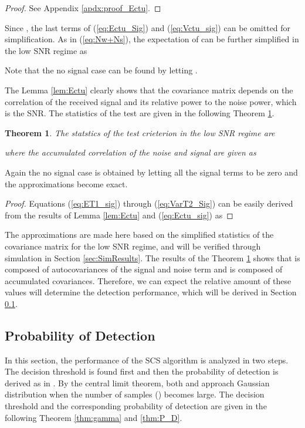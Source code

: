 \documentclass[draftclsnofoot,onecolumn,12pt]{IEEEtran}
\newtheorem{theorem}{Theorem}\newtheorem{lemma}{Lemma}
\begin{document}
\begin{proof}
  See Appendix \ref{apdx:proof_Ectu}.
\end{proof}

Since , the last terms of (\ref{eq:Ectu_Sig}) and (\ref{eq:Vctu_sig}) can be omitted for simplification. As in (\ref{eq:Nw+Ns}), the expectation of  can be further simplified in the low SNR regime as

Note that the no signal case  can be found by letting .

The Lemma \ref{lem:Ectu} clearly shows that the covariance matrix depends on the correlation of the received signal and its relative power to the noise power, which is the SNR.
The statistics of the test are given in the following Theorem \ref{thm:ET1T2}. 
\begin{theorem}\label{thm:ET1T2}
The statstics of the test crieterion in the low SNR regime are
  
  where the accumulated correlation of the noise and signal are given as
  
\end{theorem}
Again the no signal case is obtained by letting all the signal terms to be zero and the approximations become exact.

\begin{proof}
Equations (\ref{eq:ET1_sig}) through (\ref{eq:VarT2_Sig}) can be easily derived from the results of Lemma \ref{lem:Ectu} and (\ref{eq:Ectu_sig}) as
  
\end{proof}

The approximations are made here based on the simplified statistics of the covariance matrix for the low SNR regime, and will be verified through simulation in Section \ref{sec:SimResults}.
The results of the Theorem \ref{thm:ET1T2} shows that  is composed of autocovariances of the signal and noise term and  is composed of accumulated covariances. Therefore, we can expect the relative amount of these values will determine the detection performance,
which will be derived in Section \ref{subsec:ProDet}.

\subsection{Probability of Detection}
\label{subsec:ProDet}

In this section, the performance of the SCS algorithm is analyzed in two steps. The decision threshold is found first and then the probability of detection is derived as in \cite{ZenLia09}. By the central limit theorem, both  and  approach Gaussian distribution when the number of samples () becomes large.
The decision threshold and the corresponding probability of detection are given in the following Theorem \ref{thm:gamma} and \ref{thm:P_D}.
\end{document}
